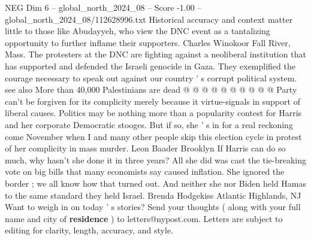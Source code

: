 \begin{textsample}{NEG Dim 6 – global\_north\_2024\_08 – Score -1.00 – global\_north\_2024\_08/112628996.txt}
Historical accuracy and context matter little to those like Abudayyeh, who view the DNC event as a tantalizing opportunity to further inflame their supporters.
Charles Winokoor Fall River, Mass.
The protesters at the DNC are fighting against a neoliberal institution that has supported and defended the Israeli genocide in Gaza.
They exemplified the courage necessary to speak out against our country ' s corrupt political system. see also More than 40,000 Palestinians are dead @ @ @ @ @ @ @ @ @ @ Party can't be forgiven for its complicity merely because it virtue-signals in support of liberal causes.
Politics may be nothing more than a popularity contest for Harris and her corporate Democratic stooges.
But if so, she ' s in for a real reckoning come November when I and many other people skip this election cycle in protest of her complicity in mass murder.
Leon Baader Brooklyn If Harris can do so much, why hasn't she done it in three years?
All she did was cast the tie-breaking vote on big bills that many economists say caused inflation.
She ignored the border ; we all know how that turned out.
And neither she nor Biden held Hamas to the same standard they held Israel.
Brenda Hodgekiss Atlantic Highlands, NJ Want to weigh in on today ' s stories?
Send your thoughts ( along with your full name and city of \textbf{residence} ) to letters@nypost.com.
Letters are subject to editing for clarity, length, accuracy, and style.

\end{textsample}
